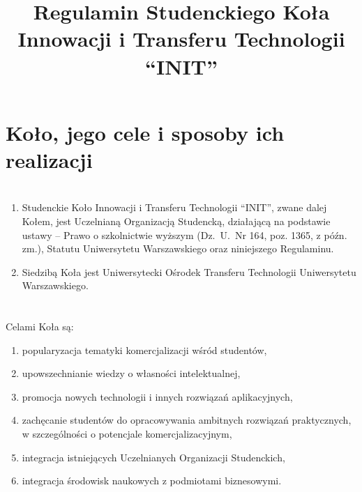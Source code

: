 \documentclass[a4paper]{article}
\author{}
\date{\vspace{-8ex}}
\title{Regulamin Studenckiego Koła Innowacji i Transferu Technologii \\``INIT''}
\begin{document}
\maketitle

\section*{Koło, jego cele i sposoby ich realizacji~~}
\section{}
\begin{enumerate}
\item Studenckie Koło Innowacji i Transferu Technologii ``INIT'', zwane dalej Kołem, jest Uczelnianą Organizacją Studencką, działającą na podstawie ustawy --  Prawo o szkolnictwie wyższym  (Dz.~U.~Nr 164, poz. 1365, z późn. zm.), Statutu Uniwersytetu Warszawskiego oraz niniejszego Regulaminu.

\item Siedzibą Koła jest Uniwersytecki Ośrodek Transferu Technologii Uniwersytetu Warszawskiego.
\end{enumerate}

\section{}

Celami Koła są:
\begin{enumerate}[label=\alph*)]
\item popularyzacja tematyki komercjalizacji wśród studentów,
\item upowszechnianie wiedzy o własności intelektualnej,
\item promocja nowych technologii i innych rozwiązań aplikacyjnych,
\item zachęcanie studentów do opracowywania ambitnych rozwiązań praktycznych, w szczególności o potencjale komercjalizacyjnym,
\item integracja istniejących Uczelnianych Organizacji Studenckich,
\item integracja środowisk naukowych z podmiotami biznesowymi.
\end{enumerate}
\section{}
\end{document}
